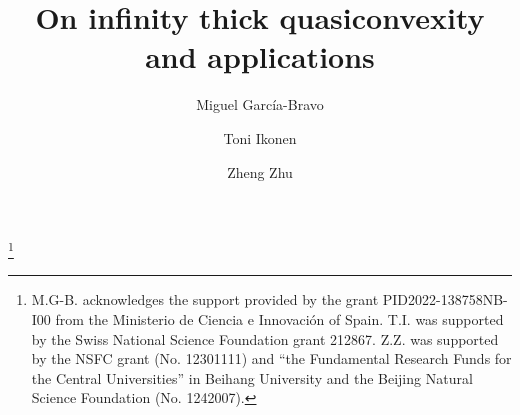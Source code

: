 \documentclass[reqno]{amsart}
\numberwithin{equation}{section}
\theoremstyle{remark}
\begin{document}
\title[Thick quasiconvexity and applications]{On infinity thick quasiconvexity and applications}

\author{Miguel Garc\'ia-Bravo}
\address{Institute of Interdisciplinary Mathematics, Department of Mathematical Analysis and Applied
Mathematics, Faculty of Mathematics, Complutense University of Madrid, 28040 Madrid, Spain} 
   


\author{Toni Ikonen} 
\address{Department of Mathematics, University of Fribourg, Chemin du Musée 23, 1700 Fribourg, Switzerland.}


\author{Zheng Zhu}

\address{School of Mathematic Sciences\\
            Beihang University\\
             Beijing, 102206\\
            P. R. China}


\thanks{M.G-B. acknowledges the support provided by the grant PID2022-138758NB-I00
from the Ministerio de Ciencia e Innovación of Spain. T.I. was supported by the Swiss National Science Foundation grant 212867. Z.Z. was supported by the NSFC grant (No. 12301111) and “the Fundamental Research Funds for the Central Universities” in Beihang University and the Beijing Natural Science Foundation (No. 1242007).}





\end{document}

